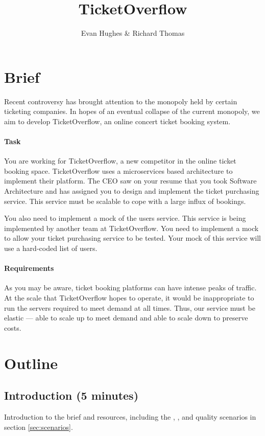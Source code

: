 \documentclass{csse4400}
\title{TicketOverflow}
\author{Evan Hughes \& Richard Thomas}
\date{\week[tutorial]{9}}
\begin{document}
\maketitle


\section{Brief}

Recent controversy has brought attention to the monopoly held by certain ticketing companies.
In hopes of an eventual collapse of the current monopoly,
we aim to develop TicketOverflow, an online concert ticket booking system.

\paragraph{Task}
You are working for TicketOverflow,
a new competitor in the online ticket booking space.
Ticket\-Overflow uses a microservices based architecture to implement their platform.
The CEO saw on your resume that you took Software Architecture and has assigned you to design and implement the ticket purchasing service.
This service must be scalable to cope with a large influx of bookings.

You also need to implement a mock of the users service.
This service is being implemented by another team at TicketOverflow.
You need to implement a mock to allow your ticket purchasing service to be tested.
Your mock of this service will use a hard-coded list of users.

\paragraph{Requirements}
As you may be aware,
ticket booking platforms can have intense peaks of traffic.
At the scale that TicketOverflow hopes to operate,
it would be inappropriate to run the servers required to meet demand at all times.
Thus, our service must be elastic --- able to scale up to meet demand and able to scale down to preserve costs.


\section{Outline}

\subsection*{Introduction (5 minutes)}
Introduction to the brief and resources,
including the ,
,
and quality scenarios in section \ref{sec:scenarios}.
\end{document}
